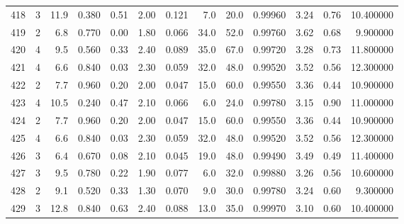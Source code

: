 \begin{tabular}{lrrrrrrrrrrrr}
418  &        3 &           11.9 &             0.380 &         0.51 &            2.00 &      0.121 &                  7.0 &                  20.0 &  0.99960 &  3.24 &       0.76 &  10.400000 \\
419  &        2 &            6.8 &             0.770 &         0.00 &            1.80 &      0.066 &                 34.0 &                  52.0 &  0.99760 &  3.62 &       0.68 &   9.900000 \\
420  &        4 &            9.5 &             0.560 &         0.33 &            2.40 &      0.089 &                 35.0 &                  67.0 &  0.99720 &  3.28 &       0.73 &  11.800000 \\
421  &        4 &            6.6 &             0.840 &         0.03 &            2.30 &      0.059 &                 32.0 &                  48.0 &  0.99520 &  3.52 &       0.56 &  12.300000 \\
422  &        2 &            7.7 &             0.960 &         0.20 &            2.00 &      0.047 &                 15.0 &                  60.0 &  0.99550 &  3.36 &       0.44 &  10.900000 \\
423  &        4 &           10.5 &             0.240 &         0.47 &            2.10 &      0.066 &                  6.0 &                  24.0 &  0.99780 &  3.15 &       0.90 &  11.000000 \\
424  &        2 &            7.7 &             0.960 &         0.20 &            2.00 &      0.047 &                 15.0 &                  60.0 &  0.99550 &  3.36 &       0.44 &  10.900000 \\
425  &        4 &            6.6 &             0.840 &         0.03 &            2.30 &      0.059 &                 32.0 &                  48.0 &  0.99520 &  3.52 &       0.56 &  12.300000 \\
426  &        3 &            6.4 &             0.670 &         0.08 &            2.10 &      0.045 &                 19.0 &                  48.0 &  0.99490 &  3.49 &       0.49 &  11.400000 \\
427  &        3 &            9.5 &             0.780 &         0.22 &            1.90 &      0.077 &                  6.0 &                  32.0 &  0.99880 &  3.26 &       0.56 &  10.600000 \\
428  &        2 &            9.1 &             0.520 &         0.33 &            1.30 &      0.070 &                  9.0 &                  30.0 &  0.99780 &  3.24 &       0.60 &   9.300000 \\
429  &        3 &           12.8 &             0.840 &         0.63 &            2.40 &      0.088 &                 13.0 &                  35.0 &  0.99970 &  3.10 &       0.60 &  10.400000 \\

\end{tabular}
